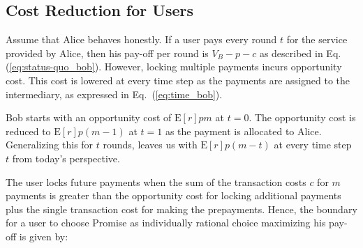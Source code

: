 \documentclass[runningheads]{llncs}
\newcommand{\sys}{Promise\xspace}
\begin{document}


\subsection{Cost Reduction for Users}
Assume that Alice behaves honestly.
If a user pays every round $t$ for the service provided by Alice, then his pay-off per round is $V_B - p - c$ as described in Eq. (\ref{eq:status-quo_bob}). %
However, locking multiple payments incurs opportunity cost.
This cost is lowered at every time step as the payments are assigned to the intermediary, as expressed in Eq.~(\ref{eq:time_bob}).

Bob starts with an opportunity cost of $\mathrm{E}[r]pm$ at $t=0$. 
The opportunity cost is reduced to $\mathrm{E}[r]p(m-1)$ at $t=1$ as the payment is allocated to Alice.
Generalizing this for $t$ rounds, leaves us with $\mathrm{E}[r]p(m-t)$ at every time step $t$ from today's perspective.

The user locks future payments when the sum of the transaction costs $c$ for $m$ payments is greater than the opportunity cost for locking additional payments plus the single transaction cost for making the prepayments.
Hence, the boundary for a user to choose \sys as individually rational choice maximizing his pay-off is given by:
\end{document}
